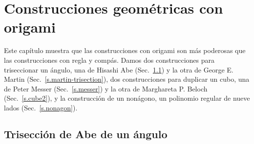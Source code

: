 
\chapter{Construcciones geométricas con origami}\label{c.origami-constructions}


Este capítulo muestra que las construcciones con origami son más poderosas que las construcciones con regla y compás. Damos dos construcciones para triseccionar un ángulo, una de Hisashi Abe (Sec.~\ref{s.abe-trisection}) y la otra de George E. Martin (Sec.~\ref{s.martin-trisection}), dos construcciones para duplicar un cubo, una de Peter Messer (Sec.~\ref{s.messer}) y la otra de Marghareta P. Beloch (Sec.~\ref{s.cube2}), y la construcción de un nonágono, un polinomio regular de nueve lados (Sec.~\ref{s.nonagon}).

\section{Trisección de Abe de un ángulo}\label{s.abe-trisection}

